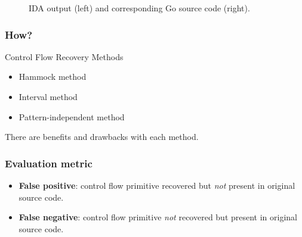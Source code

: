 \documentclass[aspectratio=1610]{beamer}
\begin{document}
\begin{frame}
\begin{figure}[htbp]
\begin{subfigure}[ht]{0.30\textwidth}
		\end{subfigure}
		\begin{subfigure}[ht]{0.40\textwidth}
			\centering
			
		\end{subfigure}
		\caption{IDA output (left) and corresponding Go source code (right).}
	\end{figure}
\end{frame}




\begin{frame}
	\frametitle{How?}

	\begin{block}{Control Flow Recovery Methods}
		\begin{itemize}
			\item Hammock method
			\item Interval method
			\item Pattern-independent method
		\end{itemize}
	\end{block}

	There are benefits and drawbacks with each method.
\end{frame}


\begin{frame}
	\frametitle{Evaluation metric}

	\begin{itemize}
		\item \textbf{False positive}: control flow primitive recovered but \textit{not} present in original source code.
		\item \textbf{False negative}: control flow primitive \textit{not} recovered but present in original source code.
	\end{itemize}
\end{frame}

\end{document}
